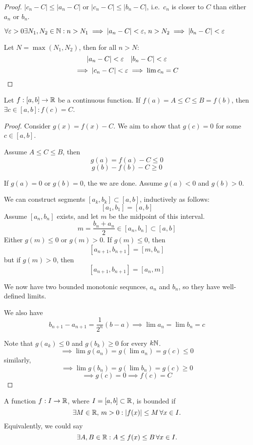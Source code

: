 \documentclass[a4paper,10pt]{article}
\begin{document}
\begin{proof}
	$|c_n -C| \leq |a_n - C|$ or $|c_n -C| \leq |b_n - C|$, i.e.\
	$c_n$ is closer to $C$ than either $a_n$ or $b_n$.

	$\forall \varepsilon > 0 \exists N_1,N_2 \in \mathbb{N} : n > N_1 \implies
	|a_n - C| < \varepsilon, \, n > N_2 \implies |b_n - C| < \varepsilon$

	Let $N = \max(N_1, N_2)$, then for all $n > N$:
	\[ |a_n - C| < \varepsilon \quad |b_n - C| < \varepsilon \]
	\[ \implies |c_n -C| < \varepsilon \implies \lim c_n = C \]
\end{proof}

\begin{thm}
	Let $f:[a,b] \to \mathbb{R}$ be a continuous function. If $f(a) = A
	\leq C \leq B = f(b)$, then $\exists c \in [a,b] : f(c) = C$.
\end{thm}

\begin{proof}
	Consider $g(x) = f(x) - C$. We aim to show that $g(c) = 0$ for some $c \in [a,b]$.

	Assume $A \leq C \leq B$, then
	\[ g(a) = f(a) - C \leq 0 \]
	\[ g(b) - f(b) - C \geq 0 \]

	If $g(a) = 0$ or $g(b) = 0$, the we are done. Assume $g(a) < 0$ and $g(b) > 0$.

	We can construct segments $[a_k, b_k] \subset [a,b]$, inductively as follows:
	\[ [a_1, b_1] = [a,b] \]
	Assume $[a_n, b_n]$ exists, and let $m$ be the midpoint of this interval.
	\[ m = \frac{b_n + a_n}{2} \in [a_n, b_n] \subset [a,b] \]
	Either $g(m) \leq 0$ or $g(m) > 0$. If $g(m) \leq 0$, then
	\[ [a_{n+1}, b_{n+1}] = [m, b_n] \]
	but if $g(m) > 0$, then
	\[ [a_{n+1}, b_{n+1}] = [a_n, m] \]

	We now have two bounded monotonic sequnces, $a_n$ and $b_n$, so
	they have well-defined limits.

	We also have
	\[
		b_{n+1} - a_{n+1} = \frac{1}{2^n}(b-a)
		\implies \lim a_n = \lim b_n = c
	\]

	Note that $g(a_k) \leq 0$ and $g(b_k) \geq 0$ for every $k \mathbb{N}$.
	\[ \implies \lim g(a_n) = g(\lim a_n) = g(c) \leq 0 \]
	similarly,
	\[ \implies \lim g(b_n) = g(\lim b_n) = g(c) \geq 0 \]
	\[ \implies g(c) = 0 \implies f(c) = C \]
\end{proof}

\begin{defn}
	A function $f:I \to \mathbb{R}$, where $I = [a,b] \subset \mathbb{R}$, is bounded if
	\[ \exists M \in \mathbb{R}, \, m > 0 : |f(x)| \leq M \, \forall x \in I. \]
	Equivalently, we could say
	\[ \exists A, B \in \mathbb{R} : A \leq f(x) \leq B \, \forall x \in I. \]
\end{defn}
\end{document}
